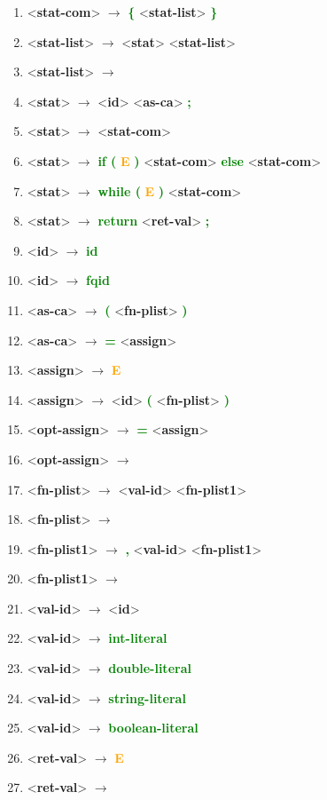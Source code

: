 \documentclass[a4paper, 11pt]{article}
\providecommand{\nonterm}[1]{\textless \textbf{#1}\textgreater}
\providecommand{\term}[1]{\textcolor{Green}{\textbf{#1}}}
\providecommand{\arrow}{ $\rightarrow$ }
\providecommand{\E}{ \textcolor{Orange}{\textbf{E}}}
\providecommand{\eps}{ \textcolor{Red}{\textbf{\textepsilon}}}
\begin{document}
\begin{enumerate}[itemsep=0mm]
        \item\nonterm{stat-com}\arrow\term{\{} \nonterm{stat-list} \term{\}}
        \item\nonterm{stat-list}\arrow\nonterm{stat} \nonterm{stat-list}
        \item\nonterm{stat-list}\arrow\eps
        \item\nonterm{stat}\arrow\nonterm{id} \nonterm{as-ca} \term{;}
        \item\nonterm{stat}\arrow\nonterm{stat-com}
        \item\nonterm{stat}\arrow\term{if (}\E\term{ )} \nonterm{stat-com} \term{else} \nonterm{stat-com}
        \item\nonterm{stat}\arrow\term{while (}\E\term{ )} \nonterm{stat-com}
        \item\nonterm{stat}\arrow\term{return} \nonterm{ret-val} \term{;}
        \item\nonterm{id}\arrow\term{id}
        \item\nonterm{id}\arrow\term{fqid}
        \item\nonterm{as-ca}\arrow\term{( }\nonterm{fn-plist} \term{)}
        \item\nonterm{as-ca}\arrow\term{= }\nonterm{assign}
        \item\nonterm{assign}\arrow\E
        \item\nonterm{assign}\arrow\nonterm{id} \term{( }\nonterm{fn-plist} \term{)}
        \item\nonterm{opt-assign}\arrow\term{= }\nonterm{assign}
        \item\nonterm{opt-assign}\arrow\eps
        \item\nonterm{fn-plist}\arrow\nonterm{val-id} \nonterm{fn-plist1}
        \item\nonterm{fn-plist}\arrow\eps
        \item\nonterm{fn-plist1}\arrow\term{,} \nonterm{val-id} \nonterm{fn-plist1}
        \item\nonterm{fn-plist1}\arrow\eps
        \item\nonterm{val-id}\arrow\nonterm{id}
        \item\nonterm{val-id}\arrow\term{int-literal}
        \item\nonterm{val-id}\arrow\term{double-literal}
        \item\nonterm{val-id}\arrow\term{string-literal}
        \item\nonterm{val-id}\arrow\term{boolean-literal}
        \item\nonterm{ret-val}\arrow\E
        \item\nonterm{ret-val}\arrow\eps
    \end{enumerate}
    \newpage
\end{document}
